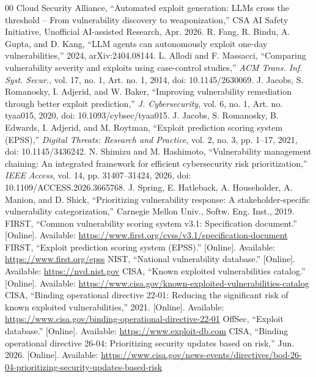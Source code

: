 \documentclass[conference]{IEEEtran}
\begin{document}
\begin{thebibliography}{00}
 Cloud Security Alliance, ``Automated exploit generation: LLMs cross the
threshold -- From vulnerability discovery to weaponization,'' CSA AI Safety Initiative,
Unofficial AI-assisted Research, Apr. 2026.
 R. Fang, R. Bindu, A. Gupta, and D. Kang, ``LLM agents can autonomously
exploit one-day vulnerabilities,'' 2024, arXiv:2404.08144.
 L. Allodi and F. Massacci, ``Comparing vulnerability severity and exploits
using case-control studies,'' \emph{ACM Trans. Inf. Syst. Secur.}, vol. 17, no. 1, Art. no. 1,
2014, doi: 10.1145/2630069.
 J. Jacobs, S. Romanosky, I. Adjerid, and W. Baker, ``Improving
vulnerability remediation through better exploit prediction,'' \emph{J. Cybersecurity},
vol. 6, no. 1, Art. no. tyaa015, 2020, doi: 10.1093/cybsec/tyaa015.
 J. Jacobs, S. Romanosky, B. Edwards, I. Adjerid, and M. Roytman, ``Exploit prediction scoring system (EPSS),'' \emph{Digital Threats: Research and Practice}, vol. 2, no. 3, pp. 1--17, 2021, doi: 10.1145/3436242.
 N. Shimizu and M. Hashimoto, ``Vulnerability management chaining: An
integrated framework for efficient cybersecurity risk prioritization,'' \emph{IEEE Access},
vol. 14, pp. 31407--31424, 2026, doi: 10.1109/ACCESS.2026.3665768.
 J. Spring, E. Hatleback, A. Householder, A. Manion, and D. Shick,
``Prioritizing vulnerability response: A stakeholder-specific vulnerability categorization,''
Carnegie Mellon Univ., Softw. Eng. Inst., 2019.
 FIRST, ``Common vulnerability scoring system v3.1: Specification document.''
[Online]. Available: \url{https://www.first.org/cvss/v3.1/specification-document}
 FIRST, ``Exploit prediction scoring system (EPSS).'' [Online]. Available:
\url{https://www.first.org/epss}
 NIST, ``National vulnerability database.'' [Online]. Available:
\url{https://nvd.nist.gov}
 CISA, ``Known exploited vulnerabilities catalog.'' [Online]. Available:
\url{https://www.cisa.gov/known-exploited-vulnerabilities-catalog}
 CISA, ``Binding operational directive 22-01: Reducing the significant risk of
known exploited vulnerabilities,'' 2021. [Online]. Available:
\url{https://www.cisa.gov/binding-operational-directive-22-01}
 OffSec, ``Exploit database.'' [Online]. Available:
\url{https://www.exploit-db.com}
 CISA, ``Binding operational directive 26-04: Prioritizing security updates based on risk,'' Jun. 2026. [Online]. Available: \url{https://www.cisa.gov/news-events/directives/bod-26-04-prioritizing-security-updates-based-risk}

\end{thebibliography}
\end{document}
